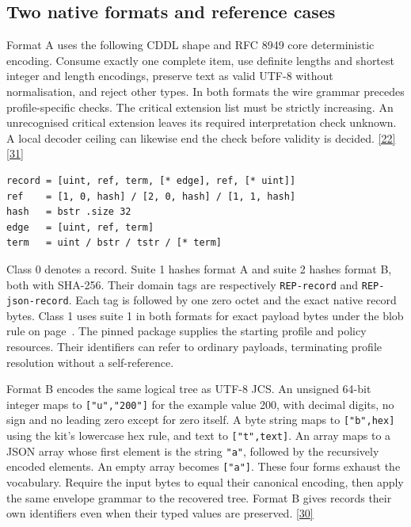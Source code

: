 \documentclass[11pt,a4paper]{article}
\newcommand{\src}[1]{\hyperlink{ref#1}{[#1]}}
\begin{document}
\subsection*{Two native formats and reference cases}\label{sec:formats}
Format A uses the following CDDL shape and RFC 8949 core deterministic encoding. Consume exactly one complete item, use definite lengths and shortest integer and length encodings, preserve text as valid UTF-8 without normalisation, and reject other types. In both formats the wire grammar precedes profile-specific checks. The critical extension list must be strictly increasing. An unrecognised critical extension leaves its required interpretation check unknown. A local decoder ceiling can likewise end the check before validity is decided. \src{22}\src{31}
\begin{small}
\begin{verbatim}
record = [uint, ref, term, [* edge], ref, [* uint]]
ref    = [1, 0, hash] / [2, 0, hash] / [1, 1, hash]
hash   = bstr .size 32
edge   = [uint, ref, term]
term   = uint / bstr / tstr / [* term]
\end{verbatim}
\end{small}
Class 0 denotes a record. Suite 1 hashes format A and suite 2 hashes format B, both with SHA-256. Their domain tags are respectively \texttt{REP-record} and \texttt{REP-json-record}. Each tag is followed by one zero octet and the exact native record bytes. Class 1 uses suite 1 in both formats for exact payload bytes under the blob rule on page~\pageref{app:exchange}. The pinned package supplies the starting profile and policy resources. Their identifiers can refer to ordinary payloads, terminating profile resolution without a self-reference.

Format B encodes the same logical tree as UTF-8 JCS. An unsigned 64-bit integer maps to \texttt{["u","200"]} for the example value 200, with decimal digits, no sign and no leading zero except for zero itself. A byte string maps to \texttt{["b",hex]} using the kit's lowercase hex rule, and text to \texttt{["t",text]}. An array maps to a JSON array whose first element is the string \texttt{"a"}, followed by the recursively encoded elements. An empty array becomes \texttt{["a"]}. These four forms exhaust the vocabulary. Require the input bytes to equal their canonical encoding, then apply the same envelope grammar to the recovered tree. Format B gives records their own identifiers even when their typed values are preserved. \src{30}
\end{document}
